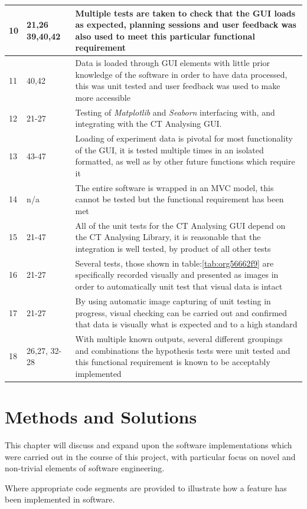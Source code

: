 \documentclass[11pt]{report}
\begin{document}
\begin{longtable}{|l|l|p{14cm}|}
\hline
10 & 21,26 39,40,42 & Multiple tests are taken to check that the GUI loads as expected, planning sessions and user feedback was also used to meet this particular functional requirement\\
\hline
11 & 40,42 & Data is loaded through GUI elements with little prior knowledge of the software in order to have data processed, this was unit tested and user feedback was used to make more accessible\\
\hline
12 & 21-27 & Testing of \emph{Matplotlib} and \emph{Seaborn} interfacing with, and integrating with the CT Analysing GUI.\\
\hline
13 & 43-47 & Loading of experiment data is pivotal for most functionality of the GUI, it is tested multiple times in an isolated formatted, as well as by other future functions which require it\\
\hline
14 & n/a & The entire software is wrapped in an MVC model, this cannot be tested but the functional requirement has been met\\
\hline
15 & 21-47 & All of the unit tests for the CT Analysing GUI depend on the CT Analysing Library, it is reasonable that the integration is well tested, by product of all other tests\\
\hline
16 & 21-27 & Several tests, those shown in table:\ref{tab:org56662f9} are specifically recorded visually and presented as images in order to automatically unit test that visual data is intact\\
\hline
17 & 21-27 & By using automatic image capturing of unit testing in progress, visual checking can be carried out and confirmed that data is visually what is expected and to a high standard\\
\hline
18 & 26,27, 32-28 & With multiple known outputs, several different groupings and combinations the hypothesis tests were unit tested and this functional requirement is known to be acceptably implemented\\
\hline
\end{longtable}

\chapter{Methods and Solutions}
\label{sec:orgee66917}
This chapter will discuss and expand upon the software implementations which were carried out in the course of this project, with particular focus on novel and non-trivial elements of software engineering.

Where appropriate code segments are provided to illustrate how a feature has been implemented in software.
\end{document}
